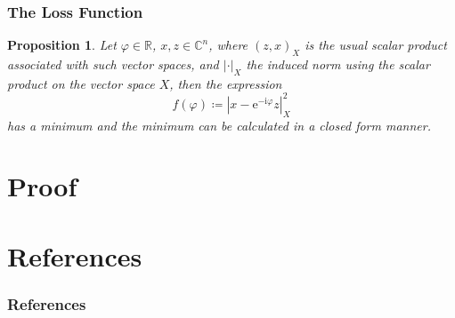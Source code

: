 \documentclass{beamer}
\newtheorem {Prop} [Thm]{Proposition}
\theoremstyle{definition}
\theoremstyle{remark}
\begin{document}
\begin{frame}
\frametitle{The Loss Function}
\begin{Prop}\label{theorem:min distance}
  Let $\varphi \in \mathbb{R}$, $x,z \in \mathbb{C}^n$, where $(z,x)_X$ is 
  the usual scalar product associated with such vector spaces, and $\left|\cdot\right|_X$ the induced norm using the scalar product on the vector space $X$, then the expression
  \begin{equation*}
    f(\varphi) \coloneqq \left|x-\mathrm{e}^{-\mathrm{i}\varphi}z\right|^2_X
  \end{equation*}
  has a minimum and the minimum can be calculated in a closed form manner.
  \end{Prop}
\end{frame}

\section{Proof}




\section[References]{References}
  \begin{frame}[allowframebreaks]
  \frametitle{References}
  \nocite{*}
  \printbibliography 
  \end{frame}
\end{document}
